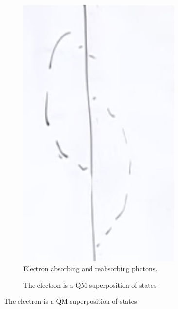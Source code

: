 \documentclass[]{article}
\begin{document}
\begin{figure}[H]
	\caption{Emission and absorption of photons}
	\begin{subfigure}[t]{0.45\textwidth}
		\caption{Electron absorbing and reabsorbing photons.}
		\includegraphics[width=0.9\textwidth]{2-1-electron-photons0}
	\end{subfigure}
	\begin{subfigure}[t]{0.45\textwidth}
		\caption{The electron is a QM superposition of states}\label{fig:2-1-electron-photonst}

\end{subfigure}
\end{figure}
\end{document}
